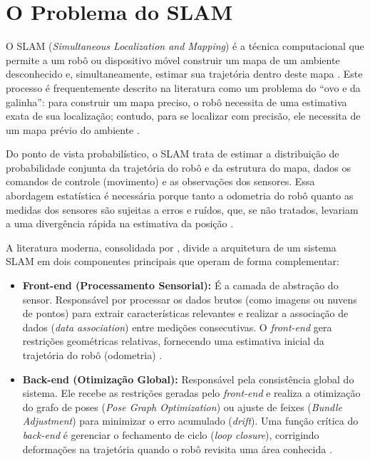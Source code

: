 \section{O Problema do SLAM}

O SLAM (\textit{Simultaneous Localization and Mapping}) é a técnica computacional que permite a um robô ou dispositivo móvel construir um mapa de um ambiente desconhecido e, simultaneamente, estimar sua trajetória dentro deste mapa \cite{taheri2021slamdefinitionevolution}. Este processo é frequentemente descrito na literatura como um problema do ``ovo e da galinha'': para construir um mapa preciso, o robô necessita de uma estimativa exata de sua localização; contudo, para se localizar com precisão, ele necessita de um mapa prévio do ambiente \cite{lemos2019plataformaroboticamovel, guapacha2017localizacaomapeamentosimultaneos}.

Do ponto de vista probabilístico, o SLAM trata de estimar a distribuição de probabilidade conjunta da trajetória do robô e da estrutura do mapa, dados os comandos de controle (movimento) e as observações dos sensores. Essa abordagem estatística é necessária porque tanto a odometria do robô quanto as medidas dos sensores são sujeitas a erros e ruídos, que, se não tratados, levariam a uma divergência rápida na estimativa da posição \cite{guapacha2017localizacaomapeamentosimultaneos, taheri2021slamdefinitionevolution}.

A literatura moderna, consolidada por , divide a arquitetura de um sistema SLAM em dois componentes principais que operam de forma complementar:

\begin{itemize}
    \item \textbf{Front-end (Processamento Sensorial):} É a camada de abstração do sensor. Responsável por processar os dados brutos (como imagens ou nuvens de pontos) para extrair características relevantes e realizar a associação de dados (\textit{data association}) entre medições consecutivas. O \textit{front-end} gera restrições geométricas relativas, fornecendo uma estimativa inicial da trajetória do robô (odometria) \cite{cadena2016presentfuturesimultaneous, jin2019visualslamrgbd}.
    
    \item \textbf{Back-end (Otimização Global):} Responsável pela consistência global do sistema. Ele recebe as restrições geradas pelo \textit{front-end} e realiza a otimização do grafo de poses (\textit{Pose Graph Optimization}) ou ajuste de feixes (\textit{Bundle Adjustment}) para minimizar o erro acumulado (\textit{drift}). Uma função crítica do \textit{back-end} é gerenciar o fechamento de ciclo (\textit{loop closure}), corrigindo deformações na trajetória quando o robô revisita uma área conhecida \cite{cadena2016presentfuturesimultaneous, labbé2019rtabmapopensourcelidar}.
\end{itemize}

